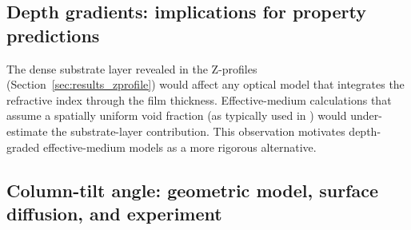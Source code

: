 \documentclass[aip,amsmath,amssymb,reprint]{revtex4-1}
\begin{document}
\subsection{Depth gradients: implications for property predictions}
\label{ssec:depth}

The dense substrate layer revealed in the Z-profiles (Section~\ref{sec:results_zprofile})
would affect any optical model that integrates the refractive index
through the film thickness.  Effective-medium calculations that assume
a spatially uniform void fraction (as typically used in
\citep{fischerscubert2013}) would under-estimate the substrate-layer
contribution.  This observation motivates depth-graded effective-medium
models as a more rigorous alternative.

\subsection{Column-tilt angle: geometric model, surface diffusion, and experiment}
\label{ssec:diffusion_comparison}
\end{document}
